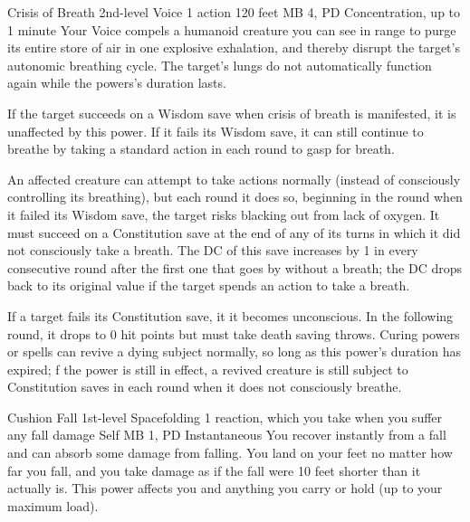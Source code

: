 \DndPowerHeader%
  {Crisis of Breath}
  {2nd-level Voice}
  {1 action}
  {120 feet}
  {MB 4, PD \lvlthree}
  {Concentration, up to 1 minute}
  Your Voice compels a humanoid creature you can see in range
  to purge its entire store of air
  in one explosive exhalation,
  and thereby disrupt the target's autonomic breathing cycle.
  The target's lungs do not automatically function
  again while the powers's duration lasts.

  If the target succeeds on a Wisdom save when
  crisis of breath is manifested,
  it is unaffected by this power.
  If it fails its Wisdom save,
  it can still continue to breathe by taking a standard action
  in each round to gasp for breath.
  
  An affected creature can attempt to take actions normally
  (instead of consciously controlling its breathing),
  but each round it does so,
  beginning in the round when it failed its Wisdom save,
  the target risks blacking out from lack of oxygen.
  It must succeed on a Constitution save
  at the end of any of its turns in which
  it did not consciously take a breath.
  The DC of this save increases by 1 in every consecutive
  round after the first one that goes by without a breath;
  the DC drops back to its original value
  if the target spends an action to take a breath.
  
  If a target fails its Constitution save,
  it it becomes unconscious.
  In the following round,
  it drops to 0 hit points
  but must take death saving throws.
  Curing powers or spells can revive a dying subject normally,
  so long as this power's duration has expired; 
  f the power is still in effect,
  a revived creature is still subject to Constitution saves
  in each round when it does not consciously breathe.

\DndPowerHeader%
  {Cushion Fall}
  {1st-level Spacefolding}
  {1 reaction, which you take when you suffer any fall damage}
  {Self}
  {MB 1, PD \lvlone}
  {Instantaneous}
  You recover instantly from a fall
  and can absorb some damage from falling.
  You land on your feet no matter how far you fall,
  and you take damage as if the fall were
  10 feet shorter than it actually is.
  This power affects you and anything you carry or hold
  (up to your maximum load).


